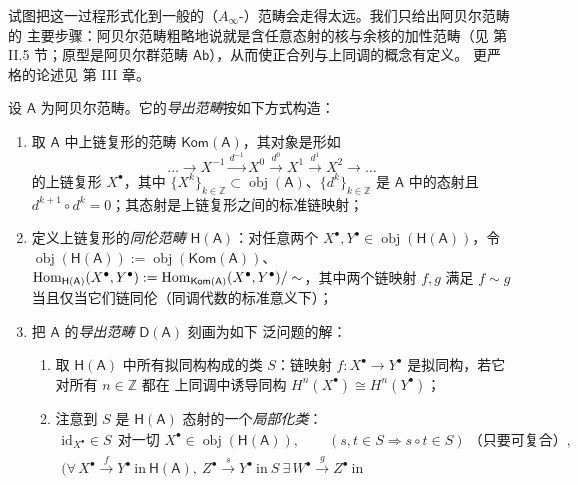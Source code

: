 试图把这一过程形式化到一般的（$A_\infty$-）范畴会走得太远。我们只给出阿贝尔范畴的
主要步骤：阿贝尔范畴粗略地说就是含任意态射的核与余核的加性范畴（见 \cite{GM03}
第 II.5 节；原型是阿贝尔群范畴 $\mathsf{Ab}$），从而使正合列与上同调的概念有定义。
更严格的论述见 \cite{GM03} 第 III 章。

\begin{Def}\label{def:3.7}
设 $\mathsf A$ 为阿贝尔范畴。它的\emph{导出范畴}按如下方式构造：
\begin{enumerate}
  \item 取 $\mathsf A$ 中上链复形的范畴 $\mathsf{Kom}(\mathsf A)$，其对象是形如
        \[
          \dots\to X^{-1}\xrightarrow{d^{-1}}X^0\xrightarrow{d^0}X^1
          \xrightarrow{d^1}X^2\to\dots
        \]
        的上链复形 $X^\bullet$，其中 $\{X^k\}_{k\in\mathbb Z}\subset
        \operatorname{obj}(\mathsf A)$、$\{d^k\}_{k\in\mathbb Z}$ 是 $\mathsf A$
        中的态射且 $d^{k+1}\circ d^k=0$；其态射是上链复形之间的标准链映射；
  \item 定义上链复形的\emph{同伦范畴} $\mathsf H(\mathsf A)$：对任意两个
        $X^\bullet,Y^\bullet\in\operatorname{obj}(\mathsf H(\mathsf A))$，令
        $\operatorname{obj}(\mathsf H(\mathsf A)):=\operatorname{obj}(\mathsf{Kom}(\mathsf A))$、
        $\operatorname{Hom}_{\mathsf H(\mathsf A)}(X^\bullet,Y^\bullet):=
        \operatorname{Hom}_{\mathsf{Kom}(\mathsf A)}(X^\bullet,Y^\bullet)/\sim$，其中两个链映射
        $f,g$ 满足 $f\sim g$ 当且仅当它们链同伦（同调代数的标准意义下）；
  \item 把 $\mathsf A$ 的\emph{导出范畴} $\mathsf D(\mathsf A)$ 刻画为如下
        泛问题的解：
  \begin{enumerate}
    \item[(a)] 取 $\mathsf H(\mathsf A)$ 中所有拟同构构成的类 $S$：链映射
          $f:X^\bullet\to Y^\bullet$ 是拟同构，若它对所有 $n\in\mathbb Z$ 都在
          上同调中诱导同构 $H^n(X^\bullet)\cong H^n(Y^\bullet)$；
    \item[(b)] 注意到 $S$ 是 $\mathsf H(\mathsf A)$ 态射的一个\emph{局部化类}：
          \[
            \begin{gathered}
              \mathrm{id}_{X^\bullet}\in S\ \ \text{对一切 }
              X^\bullet\in\operatorname{obj}(\mathsf H(\mathsf A)),\qquad
              (s,t\in S\Rightarrow s\circ t\in S)\ \text{（只要可复合）},\\
              (\forall\, X^\bullet\xrightarrow{f}Y^\bullet\ \text{in}\ 
              \mathsf H(\mathsf A),\ Z^\bullet\xrightarrow{s}Y^\bullet\ \text{in}\ S\
              \exists\, W^\bullet\xrightarrow{g}Z^\bullet\ \text{in}\ 

\end{gathered}\]
\end{enumerate}
\end{enumerate}
\end{Def}

